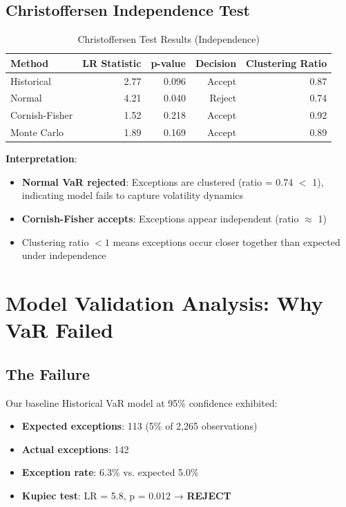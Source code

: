 \documentclass[12pt,a4paper]{article}
\begin{document}
\subsection{Christoffersen Independence Test}

\begin{table}[H]
\centering
\begin{tabular}{@{}lrrrr@{}}
\toprule
\textbf{Method} & \textbf{LR Statistic} & \textbf{p-value} & \textbf{Decision} & \textbf{Clustering Ratio} \\ \midrule
Historical & 2.77 & 0.096 & Accept & 0.87 \\
Normal & 4.21 & 0.040 & Reject & 0.74 \\
Cornish-Fisher & 1.52 & 0.218 & Accept & 0.92 \\
Monte Carlo & 1.89 & 0.169 & Accept & 0.89 \\ \bottomrule
\end{tabular}
\caption{Christoffersen Test Results (Independence)}
\end{table}

\textbf{Interpretation}:
\begin{itemize}
    \item \textbf{Normal VaR rejected}: Exceptions are clustered (ratio = 0.74 $<$ 1), indicating model fails to capture volatility dynamics
    \item \textbf{Cornish-Fisher accepts}: Exceptions appear independent (ratio $\approx$ 1)
    \item Clustering ratio $< 1$ means exceptions occur closer together than expected under independence
\end{itemize}

\newpage
\section{Model Validation Analysis: Why VaR Failed}

\subsection{The Failure}

Our baseline Historical VaR model at 95\% confidence exhibited:
\begin{itemize}
    \item \textbf{Expected exceptions}: 113 (5\% of 2,265 observations)
    \item \textbf{Actual exceptions}: 142
    \item \textbf{Exception rate}: 6.3\% vs. expected 5.0\%
    \item \textbf{Kupiec test}: LR = 5.8, p = 0.012 → \textbf{REJECT}
\end{itemize}
\end{document}
